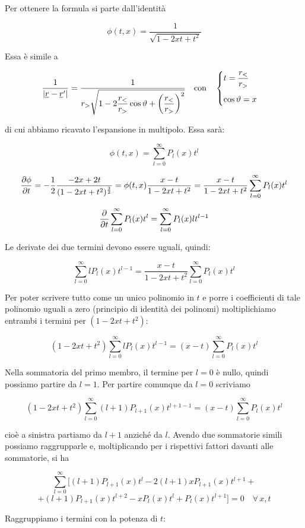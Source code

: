 Per ottenere la formula si parte dall'identità

$$\phi(t,x)=\frac{1}{\sqrt{1 - 2xt + t^2}}$$

Essa è simile a

$$\frac{1}{| \underline{r} - \underline{r}' |}
=\frac{1}{r_{>} \displaystyle \sqrt{1 - 2\frac{r_{<}}{r_{>}} \cos{\vartheta} + \qty(\frac{r_{<}}{r_{>}})^2}}
\quad\text{con}\quad
\begin{cases}
   \displaystyle t=\frac{r_{<}}{r_{>}}\\[0.4cm]
   \cos{\vartheta}=x
\end{cases}$$

di cui abbiamo ricavato l'espansione in multipolo. Essa sarà:

$$\phi(t,x)=\sum_{l=0}^{\infty} P_l(x) t^l$$

$$\pdv{\phi}{t}
=-\frac{1}{2} \frac{-2x+2t}{(1-2xt+t^2)^{\frac{3}{2}}}
=\phi(t,x) \frac{x - t}{1-2xt+t^2}
=\frac{x - t}{1-2xt+t^2} \sum_{l=0}^{\infty} P_l(x) t^l$$

$$\pdv{t} \sum_{l=0}^{\infty} P_l(x) t^l
=\sum_{l=0}^{\infty} P_l(x) l t^{l - 1}$$

Le derivate dei due termini devono essere uguali, quindi:

$$\sum_{l=0}^{\infty} l P_l(x) t^{l - 1}
=\frac{x-t}{1 - 2xt + t^2} \sum_{l=0}^{\infty} P_l(x) t^l$$

Per poter scrivere tutto come un unico polinomio in $t$ e porre i coefficienti di tale polinomio uguali a zero (principio di identità dei polinomi) moltiplichiamo entrambi i termini per $(1 - 2xt + t^2)$:

$$(1 - 2xt + t^2)\sum_{l=0}^{\infty} l P_l(x) t^{l - 1}
=(x - t) \sum_{l=0}^{\infty} P_l(x) t^l$$

Nella sommatoria del primo membro, il termine per $l=0$ è nullo, quindi possiamo partire da $l=1$. Per partire comunque da $l=0$ scriviamo

$$(1 - 2xt + t^2)\sum_{l=0}^{\infty} (l + 1) P_{l + 1}(x) t^{l +1 - 1}
=(x - t) \sum_{l=0}^{\infty} P_l(x) t^l$$

cioè a sinistra partiamo da $l+1$ anziché da $l$. Avendo due sommatorie simili possiamo raggrupparle e, moltiplicando per i rispettivi fattori davanti alle sommatorie, si ha

$$\sum_{l=0}^{\infty} \big[ (l + 1)P_{l + 1}(x) t^l - 2(l + 1)x P_{l + 1}(x) t^{l+1} +$$
$$+ (l + 1)P_{l+1}(x)t^{l+2} - x P_l(x)t^l + P_l(x)t^{l+1} \big]=0
\quad \forall \, x,t$$

Raggruppiamo i termini con la potenza di $t$:

